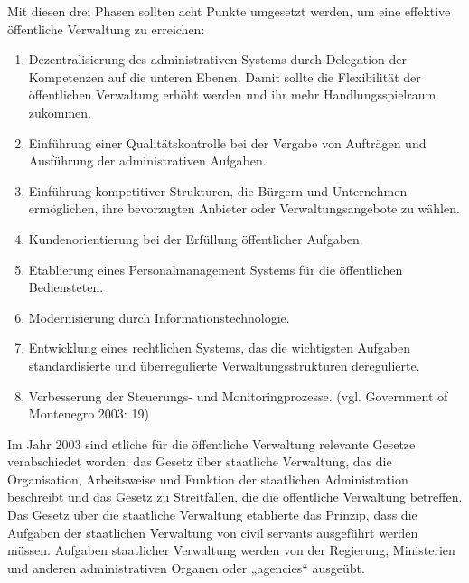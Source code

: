 Mit diesen drei Phasen sollten acht Punkte umgesetzt werden, um eine effektive öffentliche Verwaltung zu erreichen:
\begin{enumerate}[label= {\arabic*}),leftmargin=*]
\item Dezentralisierung des administrativen Systems durch Delegation der Kompetenzen auf die unteren Ebenen. Damit sollte die Flexibilität der öffentlichen Verwaltung erhöht werden und ihr mehr Handlungsspielraum zukommen.
\item Einführung einer Qualitätskontrolle bei der Vergabe von Aufträgen und Ausführung der administrativen Aufgaben.
\item Einführung kompetitiver Strukturen, die Bürgern und Unternehmen ermöglichen, ihre bevorzugten Anbieter oder Verwaltungsangebote zu wählen.
\item Kundenorientierung bei der Erfüllung öffentlicher Aufgaben.
\item Etablierung eines Personalmanagement Systems für die öffentlichen Bediensteten.
\item Modernisierung durch Informationstechnologie.
\item Entwicklung eines rechtlichen Systems, das die wichtigsten Aufgaben standardisierte und überregulierte Verwaltungsstrukturen deregulierte.
\item Verbesserung der Steuerungs- und Monitoringprozesse. (vgl. Government of Montenegro 2003: 19)
\end{enumerate}

Im Jahr 2003 sind etliche für die öffentliche Verwaltung relevante Gesetze verabschiedet worden: das Gesetz über staatliche Verwaltung, das die Organisation, Arbeitsweise und Funktion der staatlichen Administration beschreibt und das Gesetz zu Streitfällen, die die öffentliche Verwaltung betreffen. Das Gesetz über die staatliche Verwaltung etablierte das Prinzip, dass die Aufgaben der staatlichen Verwaltung von civil servants ausgeführt werden müssen. Aufgaben staatlicher Verwaltung werden von der Regierung, Ministerien und anderen administrativen Organen oder „agencies“ ausgeübt.


